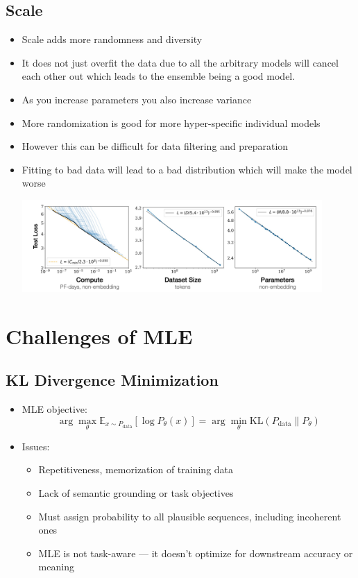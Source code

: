 \documentclass[11pt]{article}
\begin{document}
\subsection*{Scale}
\begin{itemize}
    \item Scale adds more randomness and diversity
    \item It does not just overfit the data due to all the arbitrary models will cancel each other out which leads to the ensemble being a good model.
    \item As you increase parameters you also increase variance
    \item More randomization is good for more hyper-specific individual models
    \item However this can be difficult for data filtering and preparation
    \item Fitting to bad data will lead to a bad distribution which will make the model worse
    
    
    \includegraphics[width=0.9\textwidth]{notesimage3.PNG}
\end{itemize}

\section{Challenges of MLE}
\subsection*{KL Divergence Minimization}
\begin{itemize}
    \item MLE objective: \[ \arg\max_{\theta} \mathbb{E}_{x \sim P_{\text{data}}}[\log P_{\theta}(x)] = \arg\min_{\theta} \text{KL}(P_{\text{data}} \| P_{\theta}) \]
    \item Issues:
    \begin{itemize}
        \item Repetitiveness, memorization of training data
        \item Lack of semantic grounding or task objectives
        \item Must assign probability to all plausible sequences, including incoherent ones
        \item MLE is not task-aware — it doesn't optimize for downstream accuracy or meaning
    \end{itemize}
\end{itemize}
\end{document}
